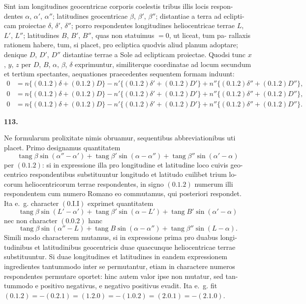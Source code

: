 \documentclass[12pt,a4paper]{article}
\DeclareMathOperator{\tang}{tang}
\begin{document}
Sint iam longitudines geocentricae corporis coelestis tribus illis locis respon-
dentes $\alpha$, $\alpha'$, $\alpha''$; latitudines geocentricae $\beta$, $\beta'$, $\beta''$; distantiae a terra ad eclipti-
cam proiectae $\delta$, $\delta'$, $\delta''$; porro respondentes longitudines heliocentricae terrae
$L$, $L'$, $L''$; latitudines $B$, $B'$, $B''$, quas non statuimus $= 0$, ut liceat, tum pa-
rallaxis rationem habere, tum, si placet, pro ecliptica quodvis aliud planum
adoptare; denique $D$, $D'$, $D''$ distantiae terrae a Sole ad eclipticam proiectae.
Quodsi tunc $x$, $y$, $z$ per $D$, $B$, $\alpha$, $\beta$, $\delta$ exprimuntur, similiterque coordinatae
ad locum secundum et tertium spectantes, aequationes praecedentes sequentem
formam induunt:
\begin{align}
0 &= n\{(0.1.2)\delta + (0.1.2)D\} - n'\{(0.1.2)\delta' + (0.1.2)D'\} + n''\{(0.1.2)\delta'' + (0.1.2)D''\}, \tag{1} \\
0 &= n\{(0.1.2)\delta + (0.1.2)D\} - n'\{(0.1.2)\delta' + (0.1.2)D'\} + n''\{(0.1.2)\delta'' + (0.1.2)D''\}, \tag{2} \\
0 &= n\{(0.1.2)\delta + (0.1.2)D\} - n'\{(0.1.2)\delta' + (0.1.2)D'\} + n''\{(0.1.2)\delta'' + (0.1.2)D''\}. \tag{3}
\end{align}


\bigskip
\noindent\textbf{113.}

Ne formularum prolixitate nimis obruamur, sequentibus abbreviationibus
uti placet. Primo designamus quantitatem
\[
\tang\beta\sin(\alpha'' - \alpha') + \tang\beta'\sin(\alpha - \alpha'') + \tang\beta''\sin(\alpha' - \alpha)
\]
per $(0.1.2)$: si in expressione illa pro longitudine et latitudine loco cuivis geo-
centrico respondentibus substituuntur longitudo et latitudo cuilibet trium lo-
corum heliocentricorum terrae respondentes, in signo $(0.1.2)$ numerum illi
respondentem cum numero Romano eo commutamus, qui posteriori respondet.
Ita e.~g. character $(0.\text{I}.\text{I})$ exprimet quantitatem
\[
\tang\beta\sin(L' - \alpha') + \tang\beta'\sin(\alpha - L') + \tang B'\sin(\alpha' - \alpha)
\]
nec non character $(0.0.2)$ hanc
\[
\tang\beta\sin(\alpha'' - L) + \tang B\sin(\alpha - \alpha'') + \tang\beta''\sin(L - \alpha).
\]
Simili modo characterem mutamus, si in expressione prima pro duabus longi-
tudinibus et latitudinibus geocentricis duae quaecunque heliocentricae terrae
substituuntur. Si duae longitudines et latitudines in eandem expressionem
ingredientes tantummodo inter se permutantur, etiam in charactere numeros
respondentes permutare oportet: hinc autem valor ipse non mutatur, sed tan-
tummodo e positivo negativus, e negativo positivus evadit. Ita e.~g. fit
$(0.1.2) = -(0.2.1) = (1.2.0) = -(1.0.2) = (2.0.1) = -(2.1.0)$.
\end{document}
